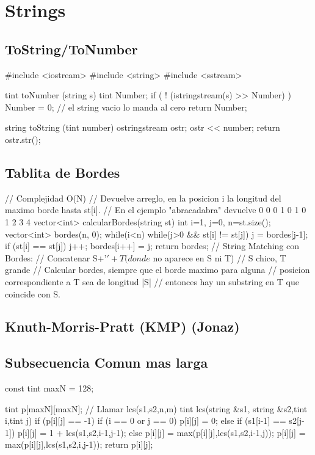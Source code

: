 \section{Strings}

\subsection{ToString/ToNumber}
\begin{code}
#include <iostream>
#include <string>
#include <sstream>

tint toNumber (string s)
{
	tint Number;
	if ( ! (istringstream(s) >> Number) )
		Number = 0; // el string vacio lo manda al cero
	return Number;
}

string toString (tint number)
{    
    ostringstream ostr;
    ostr << number;
    return  ostr.str();
}
\end{code}

\subsection{Tablita de Bordes}
\begin{code}
// Complejidad O(N)
// Devuelve arreglo, en la posicion i la longitud del maximo borde hasta st[i]. 
// En el ejemplo "abracadabra" devuelve 0 0 0 1 0 1 0 1 2 3 4 
vector<int> calcularBordes(string st) {
	int i=1, j=0, n=st.size();
	vector<int> bordes(n, 0);
	while(i<n) {
		while(j>0 && st[i] != st[j])
			j = bordes[j-1];
		if (st[i] == st[j])
			j++;
		bordes[i++] = j;
	}
	return bordes;
}
// String Matching con Bordes: 
// Concatenar S+'$'+T (donde $ no aparece en S ni T) 
// S chico, T grande
// Calcular bordes, siempre que el borde maximo para alguna 
// posicion correspondiente a T sea de longitud |S| 
// entonces hay un substring en T que coincide con S. 
\end{code}

\subsection{Knuth-Morris-Pratt (KMP) (Jonaz)}
\begin{code}
\end{code}

\subsection{Subsecuencia Comun mas larga}
\begin{code}
const tint maxN = 128;

tint p[maxN][maxN];
// Llamar lcs(s1,s2,n,m)
tint lcs(string &s1, string &s2,tint i,tint j)
{
	if (p[i][j] == -1)
	{
		if (i == 0 or j == 0)
		p[i][j] = 0;
		else
		{
			if (s1[i-1] == s2[j-1])
			p[i][j] = 1 + lcs(s1,s2,i-1,j-1);
			else
			{
				p[i][j] = max(p[i][j],lcs(s1,s2,i-1,j));
				p[i][j] = max(p[i][j],lcs(s1,s2,i,j-1));
			}
		}
	}
	return p[i][j];
}
\end{code}

